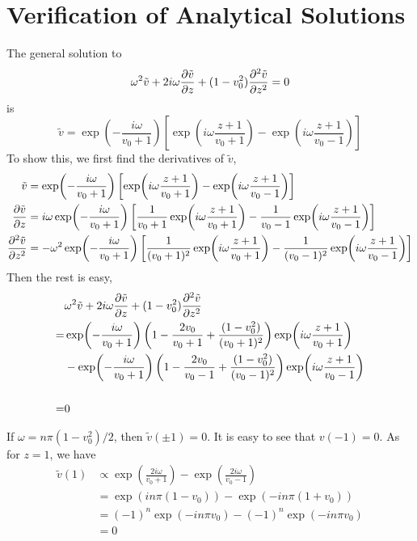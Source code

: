 \chapter{Verification of Analytical Solutions}
The general solution to
\[
    \omega^2\tilde{v} + 2i\omega\pdv{\tilde{v}}{z} + (1-v_0^2)\pdv[2]{\tilde{v}}{z} = 0
\]
is
\[
    \tilde{v} = \exp(-\frac{i\omega}{v_0+1})
    \left[ \exp(i\omega\frac{z+1}{v_0+1})
        - \exp(i\omega\frac{z+1}{v_0-1}) \right]
\]
To show this, we first find the derivatives of $\tilde{v}$,
\begin{align*}
    \tilde{v}             & = \exp(-\frac{i\omega}{v_0+1})
    \left[ \exp(i\omega\frac{z+1}{v_0+1})
    - \exp(i\omega\frac{z+1}{v_0-1}) \right]                                                                     \\
    \pdv{\tilde{v}}{z}    & = i\omega\exp(-\frac{i\omega}{v_0+1})
    \left[ \frac{1}{v_0+1}\exp(i\omega\frac{z+1}{v_0+1}) - \frac{1}{v_0-1}\exp(i\omega\frac{z+1}{v_0-1}) \right] \\
    \pdv[2]{\tilde{v}}{z} & = -\omega^2\exp(-\frac{i\omega}{v_0+1})
    \left[ \frac{1}{(v_0+1)^2}\exp(i\omega\frac{z+1}{v_0+1}) - \frac{1}{(v_0-1)^2}\exp(i\omega\frac{z+1}{v_0-1}) \right]
\end{align*}
Then the rest is easy,
\begin{align*}
      & \omega^2\tilde{v} + 2i\omega\pdv{\tilde{v}}{z} + (1-v_0^2)\pdv[2]{\tilde{v}}{z}                                            \\
    = & \exp(-\frac{i\omega}{v_0+1})
    \left(1-\frac{2v_0}{v_0+1} + \frac{(1-v_0^2)}{(v_0+1)^2}\right)\exp(i\omega\frac{z+1}{v_0+1})
    \\
      & -\exp(-\frac{i\omega}{v_0+1})\left(1-\frac{2v_0}{v_0-1} + \frac{(1-v_0^2)}{(v_0-1)^2}\right)\exp(i\omega\frac{z+1}{v_0-1}) \\
    \\
    = & 0
\end{align*}

If $\omega = n\pi(1-v_0^2)/2$, then $\tilde{v}(\pm 1) = 0$.
It is easy to see that $v(-1)=0$. As for $z=1$, we have
\begin{align*}
    \tilde{v}(1) & \propto
    \exp(\frac{2i\omega}{v_0+1}) - \exp(\frac{2i\omega}{v_0-1}) \\
                 & =
    \exp(in\pi(1-v_0)) - \exp(-in\pi(1+v_0))                    \\
                 & =
    (-1)^n\exp(-in\pi v_0) - (-1)^n\exp(-in\pi v_0)             \\
                 & = 0
\end{align*}

